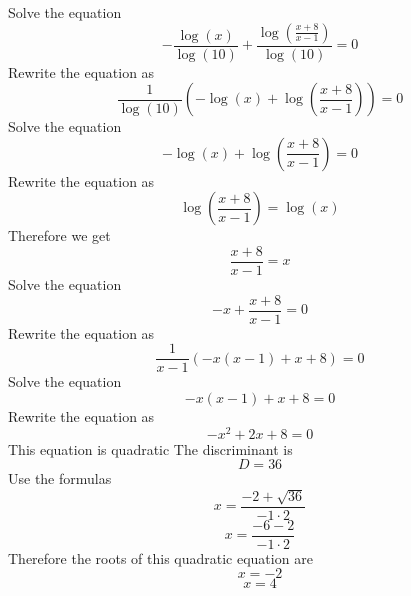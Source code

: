 \documentclass[12pt,fleqn]{article}
\begin{document}
Solve the equation
$$- \frac{\log{\left (x \right )}}{\log{\left (10 \right )}} + \frac{\log{\left (\frac{x + 8}{x - 1} \right )}}{\log{\left (10 \right )}} = 0$$
Rewrite the equation as
$$\frac{1}{\log{\left (10 \right )}} \left(- \log{\left (x \right )} + \log{\left (\frac{x + 8}{x - 1} \right )}\right) = 0$$
Solve the equation
$$- \log{\left (x \right )} + \log{\left (\frac{x + 8}{x - 1} \right )} = 0$$
Rewrite the equation as
$$\log{\left (\frac{x + 8}{x - 1} \right )} = \log{\left (x \right )}$$
Therefore we get
$$\frac{x + 8}{x - 1} = x$$
Solve the equation
$$- x + \frac{x + 8}{x - 1} = 0$$
Rewrite the equation as
$$\frac{1}{x - 1} \left(- x \left(x - 1\right) + x + 8\right) = 0$$
Solve the equation
$$- x \left(x - 1\right) + x + 8 = 0$$
Rewrite the equation as
$$- x^{2} + 2 x + 8 = 0$$
This equation is quadratic
The discriminant is
$$D = 36$$
Use the formulas
$$x = \frac{-2 + \sqrt{36}}{-1 \cdot 2}$$
$$x = \frac{- 6 - 2}{-1 \cdot 2}$$
Therefore the roots of this quadratic equation are
$$x = -2$$
$$x = 4$$
\end{document}

